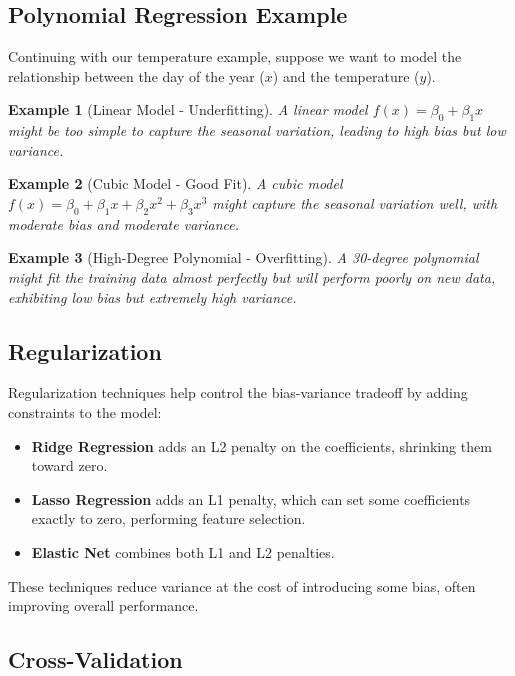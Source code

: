 \documentclass{article}
\newtheorem{example}{Example}
\begin{document}
\subsection{Polynomial Regression Example}

Continuing with our temperature example, suppose we want to model the relationship between the day of the year ($x$) and the temperature ($y$).

\begin{example}[Linear Model - Underfitting]
A linear model $f(x) = \beta_0 + \beta_1 x$ might be too simple to capture the seasonal variation, leading to high bias but low variance.
\end{example}

\begin{example}[Cubic Model - Good Fit]
A cubic model $f(x) = \beta_0 + \beta_1 x + \beta_2 x^2 + \beta_3 x^3$ might capture the seasonal variation well, with moderate bias and moderate variance.
\end{example}

\begin{example}[High-Degree Polynomial - Overfitting]
A 30-degree polynomial might fit the training data almost perfectly but will perform poorly on new data, exhibiting low bias but extremely high variance.
\end{example}

\subsection{Regularization}

Regularization techniques help control the bias-variance tradeoff by adding constraints to the model:

\begin{itemize}
\item \textbf{Ridge Regression} adds an L2 penalty on the coefficients, shrinking them toward zero.
\item \textbf{Lasso Regression} adds an L1 penalty, which can set some coefficients exactly to zero, performing feature selection.
\item \textbf{Elastic Net} combines both L1 and L2 penalties.
\end{itemize}

These techniques reduce variance at the cost of introducing some bias, often improving overall performance.

\subsection{Cross-Validation}
\end{document}
